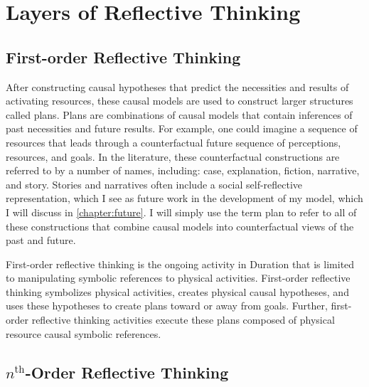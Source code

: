\chapter{Layers of Reflective Thinking}
\label{chapter:layers_of_reflective_thinking}

\section{First-order Reflective Thinking}

After constructing causal hypotheses that predict the necessities and
results of activating resources, these causal models are used to
construct larger structures called plans.  Plans are combinations of
causal models that contain inferences of past necessities and future
results.  For example, one could imagine a sequence of resources that
leads through a counterfactual future sequence of perceptions,
resources, and goals.  In the literature, these counterfactual
constructions are referred to by a number of names, including: case,
explanation, fiction, narrative, and story.  Stories and narratives
often include a social self-reflective representation, which I see as
future work in the development of my model, which I will discuss in
\autoref{chapter:future}.  I will simply use the term plan to refer to
all of these constructions that combine causal models into
counterfactual views of the past and future.

First-order reflective thinking is the ongoing activity in Duration
that is limited to manipulating symbolic references to physical
activities.  First-order reflective thinking symbolizes physical
activities, creates physical causal hypotheses, and uses these
hypotheses to create plans toward or away from goals.  Further,
first-order reflective thinking activities execute these plans
composed of physical resource causal symbolic references.

\section{$n^\text{th}$-Order Reflective Thinking}

